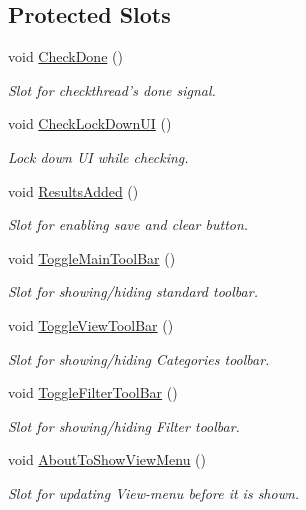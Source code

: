 \subsection*{Protected Slots}
\begin{DoxyCompactItemize}
\item 
void \hyperlink{class_main_window_ae967843e31f2ab881a6cd154f73cceae}{Check\-Done} ()
\begin{DoxyCompactList}\small\item\em Slot for checkthread's done signal. \end{DoxyCompactList}\item 
void \hyperlink{class_main_window_a971e5daaad4651953853f1f2fe09573b}{Check\-Lock\-Down\-U\-I} ()
\begin{DoxyCompactList}\small\item\em Lock down U\-I while checking. \end{DoxyCompactList}\item 
void \hyperlink{class_main_window_ad3d3acaafb9b3bc793b438a026878e53}{Results\-Added} ()
\begin{DoxyCompactList}\small\item\em Slot for enabling save and clear button. \end{DoxyCompactList}\item 
void \hyperlink{class_main_window_aebc0fc2ed8aeb50e3f05e1fe7a8bc64f}{Toggle\-Main\-Tool\-Bar} ()
\begin{DoxyCompactList}\small\item\em Slot for showing/hiding standard toolbar. \end{DoxyCompactList}\item 
void \hyperlink{class_main_window_a6ea89ff7dc3fee9cd6a80f17fc7f3d5c}{Toggle\-View\-Tool\-Bar} ()
\begin{DoxyCompactList}\small\item\em Slot for showing/hiding Categories toolbar. \end{DoxyCompactList}\item 
void \hyperlink{class_main_window_a5fb4fd8b2d8ecf6e1bc960ed96653990}{Toggle\-Filter\-Tool\-Bar} ()
\begin{DoxyCompactList}\small\item\em Slot for showing/hiding Filter toolbar. \end{DoxyCompactList}\item 
void \hyperlink{class_main_window_a6f0b577a6dc2835c4448e0de660a800e}{About\-To\-Show\-View\-Menu} ()
\begin{DoxyCompactList}\small\item\em Slot for updating View-\/menu before it is shown. \end{DoxyCompactList}\item 

\end{DoxyCompactItemize}
